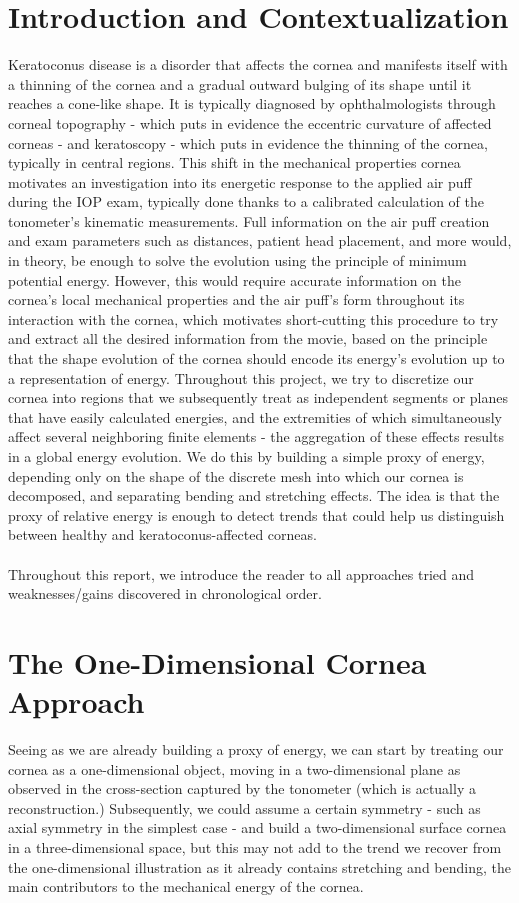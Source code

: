 \documentclass[epjST]{svjour}
\begin{document}
\section{Introduction and Contextualization}
Keratoconus disease is a disorder that affects the cornea and manifests itself with a thinning of the cornea and a gradual outward bulging of its shape until it reaches a cone-like shape. It is typically diagnosed by ophthalmologists through corneal topography - which puts in evidence the eccentric curvature of affected corneas - and keratoscopy - which puts in evidence the thinning of the cornea, typically in central regions. This shift in the mechanical properties cornea motivates an investigation into its energetic response to the applied air puff during the IOP exam, typically done thanks to a calibrated calculation of the tonometer's kinematic measurements. Full information on the air puff creation and exam parameters such as distances, patient head placement, and more would, in theory, be enough to solve the evolution using the principle of minimum potential energy. However, this would require accurate information on the cornea's local mechanical properties and the air puff's form throughout its interaction with the cornea, which motivates short-cutting this procedure to try and extract all the desired information from the movie, based on the principle that the shape evolution of the cornea should encode its energy's evolution up to a representation of energy. Throughout this project, we try to discretize our cornea into regions that we subsequently treat as independent segments or planes that have easily calculated energies, and the extremities of which simultaneously affect several neighboring finite elements - the aggregation of these effects results in a global energy evolution. We do this by building a simple proxy of energy, depending only on the shape of the discrete mesh into which our cornea is decomposed, and separating bending and stretching effects. The idea is that the proxy of relative energy is enough to detect trends that could help us distinguish between healthy and keratoconus-affected corneas.
\\\\
Throughout this report, we introduce the reader to all approaches tried and weaknesses/gains discovered in chronological order.
\section{The One-Dimensional Cornea Approach}
Seeing as we are already building a proxy of energy, we can start by treating our cornea as a one-dimensional object, moving in a two-dimensional plane as observed in the cross-section captured by the tonometer (which is actually a reconstruction.) Subsequently, we could assume a certain symmetry - such as axial symmetry in the simplest case - and build a two-dimensional surface cornea in a three-dimensional space, but this may not add to the trend we recover from the one-dimensional illustration as it already contains stretching and bending, the main contributors to the mechanical energy of the cornea.
\end{document}
